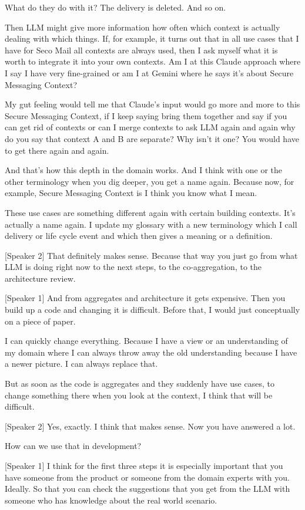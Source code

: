 What do they do with it? The delivery is deleted. And so on.

Then LLM might give more information how often which context is actually dealing with which things. If, for example, it turns out that in all use cases that I have for Seco Mail all contexts are always used, then I ask myself what it is worth to integrate it into your own contexts. Am I at this Claude approach where I say I have very fine-grained or am I at Gemini where he says it's about Secure Messaging Context?

My gut feeling would tell me that Claude's input would go more and more to this Secure Messaging Context, if I keep saying bring them together and say if you can get rid of contexts or can I merge contexts to ask LLM again and again why do you say that context A and B are separate? Why isn't it one? You would have to get there again and again.

And that's how this depth in the domain works. And I think with one or the other terminology when you dig deeper, you get a name again. Because now, for example, Secure Messaging Context is I think you know what I mean.

These use cases are something different again with certain building contexts. It's actually a name again. I update my glossary with a new terminology which I call delivery or life cycle event and which then gives a meaning or a definition.

[Speaker 2]
That definitely makes sense. Because that way you just go from what LLM is doing right now to the next steps, to the co-aggregation, to the architecture review.

[Speaker 1]
And from aggregates and architecture it gets expensive. Then you build up a code and changing it is difficult. Before that, I would just conceptually on a piece of paper.

I can quickly change everything. Because I have a view or an understanding of my domain where I can always throw away the old understanding because I have a newer picture. I can always replace that.

But as soon as the code is aggregates and they suddenly have use cases, to change something there when you look at the context, I think that will be difficult.

[Speaker 2]
Yes, exactly. I think that makes sense. Now you have answered a lot.

How can we use that in development?

[Speaker 1]
I think for the first three steps it is especially important that you have someone from the product or someone from the domain experts with you. Ideally. So that you can check the suggestions that you get from the LLM with someone who has knowledge about the real world scenario.

